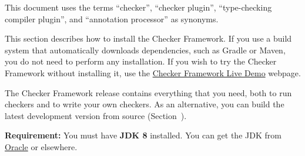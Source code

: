 





This document uses the terms ``checker'', ``checker plugin'',
``type-checking compiler plugin'', and ``annotation processor'' as
synonyms.


\begin{sloppypar}
This section describes how to install the Checker Framework.
If you use a build system that automatically downloads dependencies,
such as Gradle or Maven, you do not need to perform any installation.
If you wish to try the Checker Framework without installing it, use the
\href{http://eisop.uwaterloo.ca/live/}{Checker Framework Live Demo} webpage.
\end{sloppypar}

The Checker Framework release contains everything that you need, both to
run checkers and to write your own checkers.  As an alternative, you can
build the latest development version from source
(Section~).

\textbf{Requirement:}
You must have \textbf{JDK 8}
installed.  You can get the JDK from
\href{https://www.oracle.com/technetwork/java/javase/downloads/index.html}{Oracle}
or elsewhere.

